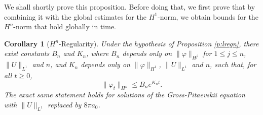 \documentclass[11pt,a4paper,draft,DIV11]{scrartcl}	%
\newtheorem{cor}[thm]{Corollary}
\begin{document}
We shall shortly prove this proposition. Before doing that, we first prove
that by combining it with the global estimates for the $H^1$-norm, we obtain
bounds for the $H^n$-norm that hold globally in time.


\begin{cor}[$H^n$-Regularity] \label{c:regn}
  Under the hypothesis of Proposition \ref{p:lregn}, there exist constants
  $B_n$ and $K_n$, where $B_n$ depends only on $\| \varphi \|_{H^j}$ for $1
  \le j \le n$, $\| U \|_{L^1}$ and $n$, and $K_n$ depends only on $\|
  \varphi \|_{H^1}$, $\| U \|_{L^1}$ and $n$, such that, for all $t \ge 0$,
  \[
    \| \varphi_t \|_{H^n} \le B_n e^{K_n t}.
  \]
  The exact same statement holds for solutions of the Gross-Pitaevskii
  equation with $\| U \|_{L^1}$ replaced by $8 \pi a_0$.
\end{cor}
\end{document}
